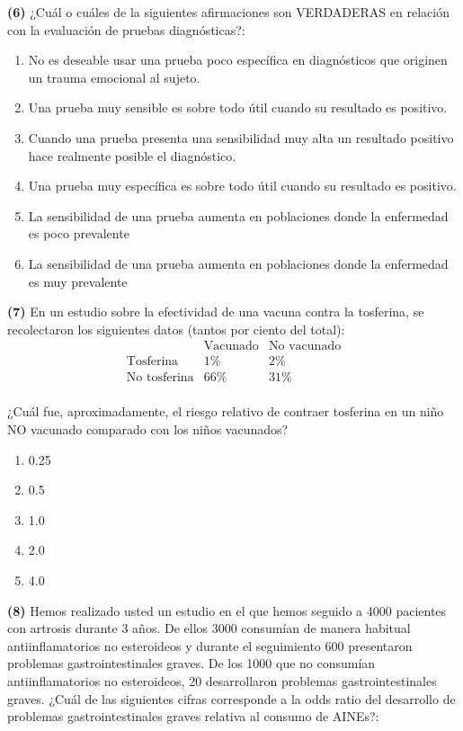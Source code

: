 \documentclass[
]{book}
\providecommand{\tightlist}{%
  \setlength{\itemsep}{0pt}\setlength{\parskip}{0pt}}
\theoremstyle{definition}
\theoremstyle{definition}
\theoremstyle{definition}
\theoremstyle{definition}
\theoremstyle{remark}
\begin{document}
\textbf{(6)} ¿Cuál o cuáles de la siguientes afirmaciones son VERDADERAS en relación
con la evaluación de pruebas diagnósticas?:

\begin{enumerate}
\def\labelenumi{\arabic{enumi}.}
\tightlist
\item
  No es deseable usar una prueba poco específica en diagnósticos que originen un trauma emocional al sujeto.
\item
  Una prueba muy sensible es sobre todo útil cuando su resultado es positivo.
\item
  Cuando una prueba presenta una sensibilidad muy alta un resultado positivo hace realmente posible el diagnóstico.
\item
  Una prueba muy específica es sobre todo útil cuando su resultado es positivo.\\
\item
  La sensibilidad de una prueba aumenta en poblaciones donde la enfermedad es poco prevalente\\
\item
  La sensibilidad de una prueba aumenta en poblaciones donde la enfermedad es muy prevalente
\end{enumerate}

\textbf{(7)} En un estudio sobre la efectividad de una vacuna contra la tosferina, se recolectaron los siguientes datos (tantos por ciento del total):
\[
\begin{array}{r|cc}
 & \text{Vacunado} & \text{No vacunado}\\ \hline
\text{Tosferina} & 1\% & 2\% \\  
\text{No tosferina} & 66\% &  31\%\\ 
\end{array}
\]

¿Cuál fue, aproximadamente, el riesgo relativo de contraer tosferina en un niño NO vacunado comparado con los niños vacunados?

\begin{enumerate}
\def\labelenumi{\arabic{enumi}.}
\tightlist
\item
  0.25
\item
  0.5
\item
  1.0
\item
  2.0
\item
  4.0
\end{enumerate}

\textbf{(8)} Hemos realizado usted un estudio en el que hemos seguido
a 4000 pacientes con artrosis durante
3 años. De ellos 3000 consumían de manera
habitual antiinflamatorios no esteroideos y
durante el seguimiento 600 presentaron problemas
gastrointestinales graves. De los 1000
que no consumían antiinflamatorios no esteroideos,
20 desarrollaron problemas gastrointestinales
graves. ¿Cuál de las
siguientes cifras corresponde a la odds ratio
del desarrollo de problemas
gastrointestinales graves relativa al consumo de AINEs?:
\end{document}
